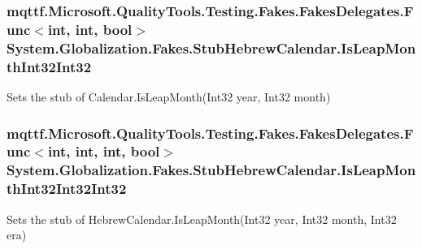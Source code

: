 \hypertarget{class_system_1_1_globalization_1_1_fakes_1_1_stub_hebrew_calendar_ab3ecbffa03820cef37341d1536af9dde}{
\subsubsection[{Is\-Leap\-Month\-Int32\-Int32}]{\setlength{\rightskip}{0pt plus 5cm}mqttf.\-Microsoft.\-Quality\-Tools.\-Testing.\-Fakes.\-Fakes\-Delegates.\-Func$<$int, int, bool$>$ System.\-Globalization.\-Fakes.\-Stub\-Hebrew\-Calendar.\-Is\-Leap\-Month\-Int32\-Int32}}\label{class_system_1_1_globalization_1_1_fakes_1_1_stub_hebrew_calendar_ab3ecbffa03820cef37341d1536af9dde}


Sets the stub of Calendar.\-Is\-Leap\-Month(\-Int32 year, Int32 month)

\hypertarget{class_system_1_1_globalization_1_1_fakes_1_1_stub_hebrew_calendar_a5945fcf154e52075ce06bea4508a0827}{
\subsubsection[{Is\-Leap\-Month\-Int32\-Int32\-Int32}]{\setlength{\rightskip}{0pt plus 5cm}mqttf.\-Microsoft.\-Quality\-Tools.\-Testing.\-Fakes.\-Fakes\-Delegates.\-Func$<$int, int, int, bool$>$ System.\-Globalization.\-Fakes.\-Stub\-Hebrew\-Calendar.\-Is\-Leap\-Month\-Int32\-Int32\-Int32}}\label{class_system_1_1_globalization_1_1_fakes_1_1_stub_hebrew_calendar_a5945fcf154e52075ce06bea4508a0827}


Sets the stub of Hebrew\-Calendar.\-Is\-Leap\-Month(\-Int32 year, Int32 month, Int32 era)

